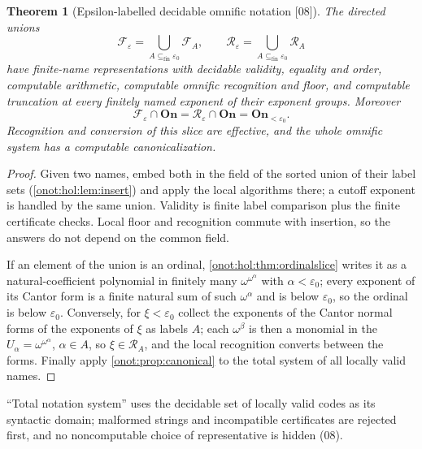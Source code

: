 \documentclass[11pt,oneside]{article}
\numberwithin{equation}{section}
\newtheorem{theorem}{Theorem}[section]
\theoremstyle{definition}
\theoremstyle{remark}
\newcommand{\On}{\mathbf{On}}
\newcommand{\src}[1]{\textup{\textsf{\small[#1]}}}
\begin{document}
\begin{theorem}[Epsilon-labelled decidable omnific notation \src{08}]\label{onot:hol:thm:epsilon}
The directed unions
\[
 \mathcal F_\varepsilon=\bigcup_{A\subseteq_{\mathrm{fin}}\varepsilon_0}\mathcal F_A,\qquad
 \mathcal R_\varepsilon=\bigcup_{A\subseteq_{\mathrm{fin}}\varepsilon_0}\mathcal R_A
\]
have finite-name representations with decidable validity, equality and order,
computable arithmetic, computable omnific recognition and floor, and computable
truncation at every finitely named exponent of their exponent groups. Moreover
\begin{equation}\label{onot:hol:eq:epsilontrace}
 \mathcal F_\varepsilon\cap\On=\mathcal R_\varepsilon\cap\On=\On_{<\varepsilon_0}.
\end{equation}
Recognition and conversion of this slice are effective, and the whole omnific
system has a computable canonicalization.
\end{theorem}
\begin{proof}
Given two names, embed both in the field of the sorted union of their label sets
(\cref{onot:hol:lem:insert}) and apply the local algorithms there; a cutoff
exponent is handled by the same union. Validity is finite label comparison plus
the finite certificate checks. Local floor and recognition commute with
insertion, so the answers do not depend on the common field.

If an element of the union is an ordinal, \cref{onot:hol:thm:ordinalslice}
writes it as a natural-coefficient polynomial in finitely many
$\omega^{\omega^\alpha}$ with $\alpha<\varepsilon_0$; every exponent of its Cantor
form is a finite natural sum of such $\omega^\alpha$ and is below $\varepsilon_0$,
so the ordinal is below $\varepsilon_0$. Conversely, for $\xi<\varepsilon_0$
collect the exponents of the Cantor normal forms of the exponents of $\xi$ as
labels $A$; each $\omega^\beta$ is then a monomial in the
$U_\alpha=\omega^{\omega^\alpha}$, $\alpha\in A$, so $\xi\in\mathcal R_A$, and the
local recognition converts between the forms. Finally apply
\cref{onot:prop:canonical} to the total system of all locally valid names.
\end{proof}

``Total notation system'' uses the decidable set of locally valid codes as its
syntactic domain; malformed strings and incompatible certificates are rejected
first, and no noncomputable choice of representative is hidden (08).
\end{document}
